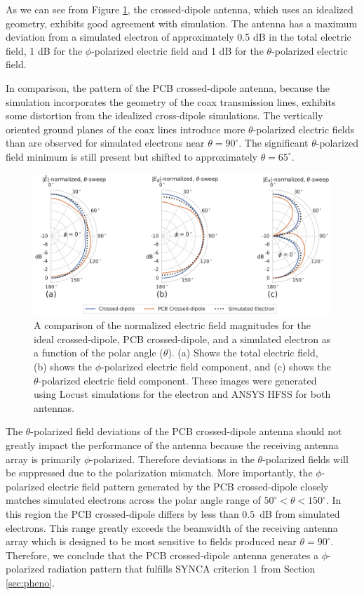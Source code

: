 As we can see from Figure \ref{fig:field-comparison-theta}, the crossed-dipole antenna, which uses an idealized geometry, exhibits good agreement with simulation. The antenna has a maximum deviation from a simulated electron of approximately 0.5 dB in the total electric field, 1 dB for the $\phi$-polarized electric field and 1 dB for the $\theta$-polarized electric field.

In comparison, the pattern of the PCB crossed-dipole antenna, because the simulation incorporates the geometry of the coax transmission lines, exhibits some distortion from the idealized cross-dipole simulations. The vertically oriented ground planes of the coax lines introduce more $\theta$-polarized electric fields than are observed for simulated electrons near $\theta=90^\circ$. The significant $\theta$-polarized field minimum is still present but shifted to approximately $\theta=65^\circ$.
\begin{figure}[h]
    \centering
    \includegraphics[width=1.\textwidth]{figs/Chapter-5/221101_field_mag_comparison_theta_only.png}
    \caption{A comparison of the normalized electric field magnitudes for the ideal crossed-dipole, PCB crossed-dipole, and a simulated electron as a function of the polar angle ($\theta$). (a) Shows the total electric field, (b) shows the $\phi$-polarized electric field component, and (c) shows the $\theta$-polarized electric field component. These images were generated using Locust simulations for the electron and ANSYS HFSS for both antennas.} 
    \label{fig:field-comparison-theta}
\end{figure}
The $\theta$-polarized field deviations of the PCB crossed-dipole antenna should not greatly impact the performance of the antenna because the receiving antenna array is primarily $\phi$-polarized. Therefore deviations in the $\theta$-polarized fields will be suppressed due to the polarization mismatch. More importantly, the $\phi$-polarized electric field pattern generated by the PCB crossed-dipole closely matches simulated electrons across the polar angle range of $50^\circ<\theta<150^\circ$. In this region the PCB crossed-dipole differs by less than $0.5$~dB from simulated electrons. This range greatly exceeds the beamwidth of the receiving antenna array which is designed to be most sensitive to fields produced near $\theta=90^\circ$. Therefore, we conclude that the PCB crossed-dipole antenna generates a $\phi$-polarized radiation pattern that fulfills SYNCA criterion 1 from Section \ref{sec:pheno}.

